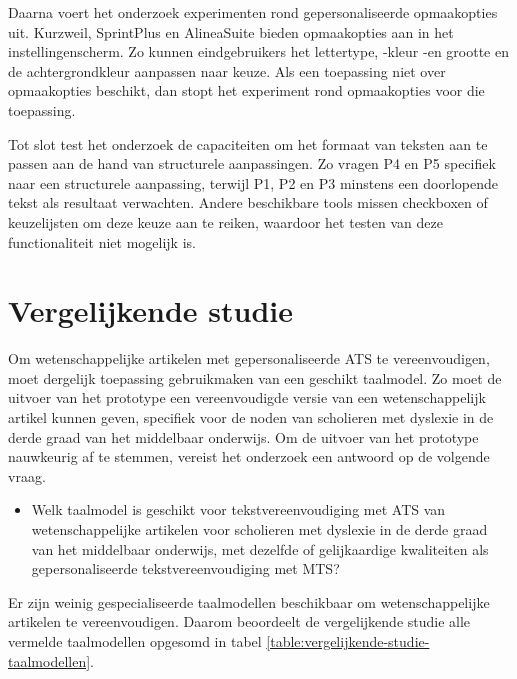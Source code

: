 \medspace

Daarna voert het onderzoek experimenten rond gepersonaliseerde opmaakopties uit. Kurzweil, SprintPlus en AlineaSuite bieden opmaakopties aan in het instellingenscherm. Zo kunnen eindgebruikers het lettertype, -kleur -en grootte en de achtergrondkleur aanpassen naar keuze. Als een toepassing niet over opmaakopties beschikt, dan stopt het experiment rond opmaakopties voor die toepassing.

\medspace

Tot slot test het onderzoek de capaciteiten om het formaat van teksten aan te passen aan de hand van structurele aanpassingen. Zo vragen P4 en P5 specifiek naar een structurele aanpassing, terwijl P1, P2 en P3 minstens een doorlopende tekst als resultaat verwachten. Andere beschikbare tools missen checkboxen of keuzelijsten om deze keuze aan te reiken, waardoor het testen van deze functionaliteit niet mogelijk is.

\section{Vergelijkende studie}
\label{sec:vergelijkende-studie}

Om wetenschappelijke artikelen met gepersonaliseerde ATS te vereenvoudigen, moet dergelijk toepassing gebruikmaken van een geschikt taalmodel. Zo moet de uitvoer van het prototype een vereenvoudigde versie van een wetenschappelijk artikel kunnen geven, specifiek voor de noden van scholieren met dyslexie in de derde graad van het middelbaar onderwijs. Om de uitvoer van het prototype nauwkeurig af te stemmen, vereist het onderzoek een antwoord op de volgende vraag.

\begin{itemize}
	\item Welk taalmodel is geschikt voor tekstvereenvoudiging met ATS van wetenschappelijke artikelen voor scholieren met dyslexie in de derde graad van het middelbaar onderwijs, met dezelfde of gelijkaardige kwaliteiten als gepersonaliseerde tekstvereenvoudiging met MTS?
\end{itemize}

Er zijn weinig gespecialiseerde taalmodellen beschikbaar om wetenschappelijke artikelen te vereenvoudigen. Daarom beoordeelt de vergelijkende studie alle vermelde taalmodellen opgesomd in tabel \ref{table:vergelijkende-studie-taalmodellen}.

